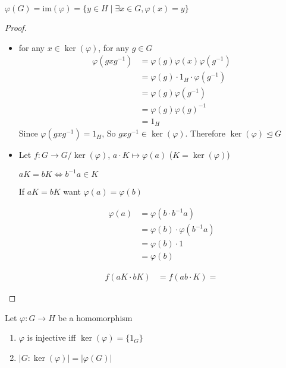 \begin{definition}
  $\varphi(G) = \text{im}(\varphi) = \{y \in H \mid \exists x \in G, \varphi(x) = y\}$
\end{definition}
\begin{proof}
  \text{ }
  \begin{itemize}
    \item for any $x \in \ker(\varphi)$, for any $g \in G$
    \begin{align*}
      \varphi(gxg^{-1}) &= \varphi(g)\varphi(x)\varphi(g^{-1}) \\
      &= \varphi(g)\cdot 1_H\cdot \varphi(g^{-1}) \\
      &= \varphi(g)\varphi(g^{-1}) \\
      &= \varphi(g)\varphi(g)^{-1} \\
      &= 1_H
    \end{align*}
    Since $\varphi(gxg^{-1}) = 1_H$, So $gxg^{-1} \in \ker(\varphi)$.
    Therefore $\ker(\varphi) \trianglelefteq G$
    \item
  Let $f: G \to G/\ker(\varphi)$, $a\cdot K \mapsto \varphi(a)$ ($K = \ker(\varphi)$)

  $aK = bK \iff b^{-1}a \in K$

  If $aK = bK$ want $\varphi(a) = \varphi(b)$

  \begin{align*}
    \varphi(a) &= \varphi(b \cdot b^{-1}a) \\
    &= \varphi(b) \cdot \varphi(b^{-1}a) \\
    &= \varphi(b) \cdot 1 \\
    &= \varphi(b)
  \end{align*}

  \begin{align*}
    f(aK \cdot bK) &= f(ab \cdot K) = 
  \end{align*}

  \end{itemize}
\end{proof}

\begin{corollary}
  Let $\varphi: G \to H$ be a homomorphism
  \begin{enumerate}
    \item $\varphi$ is injective iff $\ker(\varphi) = \{1_G\}$
    \item $|G : \ker(\varphi)| = |\varphi(G)|$
  \end{enumerate}
\end{corollary}

